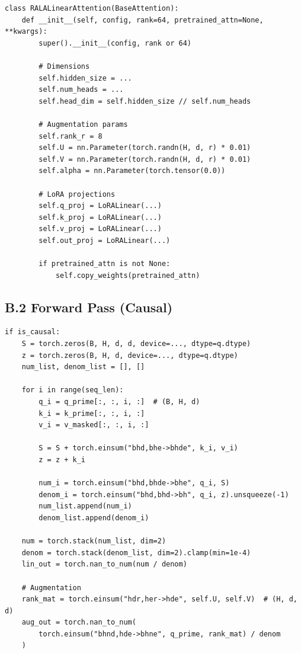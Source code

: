 \begin{lstlisting}
class RALALinearAttention(BaseAttention):
    def __init__(self, config, rank=64, pretrained_attn=None, **kwargs):
        super().__init__(config, rank or 64)
        
        # Dimensions
        self.hidden_size = ...
        self.num_heads = ...
        self.head_dim = self.hidden_size // self.num_heads
        
        # Augmentation params
        self.rank_r = 8
        self.U = nn.Parameter(torch.randn(H, d, r) * 0.01)
        self.V = nn.Parameter(torch.randn(H, d, r) * 0.01)
        self.alpha = nn.Parameter(torch.tensor(0.0))
        
        # LoRA projections
        self.q_proj = LoRALinear(...)
        self.k_proj = LoRALinear(...)
        self.v_proj = LoRALinear(...)
        self.out_proj = LoRALinear(...)
        
        if pretrained_attn is not None:
            self.copy_weights(pretrained_attn)
\end{lstlisting}

\subsection{B.2 Forward Pass (Causal)}

\begin{lstlisting}
if is_causal:
    S = torch.zeros(B, H, d, d, device=..., dtype=q.dtype)
    z = torch.zeros(B, H, d, device=..., dtype=q.dtype)
    num_list, denom_list = [], []
    
    for i in range(seq_len):
        q_i = q_prime[:, :, i, :]  # (B, H, d)
        k_i = k_prime[:, :, i, :]
        v_i = v_masked[:, :, i, :]
        
        S = S + torch.einsum("bhd,bhe->bhde", k_i, v_i)
        z = z + k_i
        
        num_i = torch.einsum("bhd,bhde->bhe", q_i, S)
        denom_i = torch.einsum("bhd,bhd->bh", q_i, z).unsqueeze(-1)
        num_list.append(num_i)
        denom_list.append(denom_i)
    
    num = torch.stack(num_list, dim=2)
    denom = torch.stack(denom_list, dim=2).clamp(min=1e-4)
    lin_out = torch.nan_to_num(num / denom)
    
    # Augmentation
    rank_mat = torch.einsum("hdr,her->hde", self.U, self.V)  # (H, d, d)
    aug_out = torch.nan_to_num(
        torch.einsum("bhnd,hde->bhne", q_prime, rank_mat) / denom
    )
\end{lstlisting}

